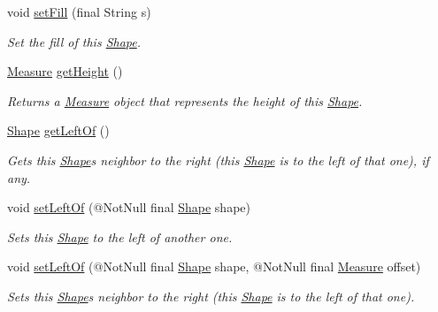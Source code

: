 \begin{DoxyCompactItemize}
void \hyperlink{classcom_1_1aarrelaakso_1_1drawl_1_1_shape_a81ff4feb49b8f74c1a639564748a23ee}{set\+Fill} (final String s)
\begin{DoxyCompactList}\small\item\em Set the fill of this \hyperlink{classcom_1_1aarrelaakso_1_1drawl_1_1_shape}{Shape}. \end{DoxyCompactList}\item 
\hyperlink{classcom_1_1aarrelaakso_1_1drawl_1_1_measure}{Measure} \hyperlink{classcom_1_1aarrelaakso_1_1drawl_1_1_shape_ac9f74d31c332aab76b329edc22080e67}{get\+Height} ()
\begin{DoxyCompactList}\small\item\em Returns a \hyperlink{classcom_1_1aarrelaakso_1_1drawl_1_1_measure}{Measure} object that represents the height of this \hyperlink{classcom_1_1aarrelaakso_1_1drawl_1_1_shape}{Shape}. \end{DoxyCompactList}\item 
\hyperlink{classcom_1_1aarrelaakso_1_1drawl_1_1_shape}{Shape} \hyperlink{classcom_1_1aarrelaakso_1_1drawl_1_1_shape_a2b19d5964ac46d545a7bae3133df6532}{get\+Left\+Of} ()
\begin{DoxyCompactList}\small\item\em Gets this \hyperlink{classcom_1_1aarrelaakso_1_1drawl_1_1_shape}{Shape}\textquotesingle{}s neighbor to the right (this \hyperlink{classcom_1_1aarrelaakso_1_1drawl_1_1_shape}{Shape} is to the left of that one), if any. \end{DoxyCompactList}\item 
void \hyperlink{classcom_1_1aarrelaakso_1_1drawl_1_1_shape_a0aef56392d76202235a9520394e87492}{set\+Left\+Of} (@Not\+Null final \hyperlink{classcom_1_1aarrelaakso_1_1drawl_1_1_shape}{Shape} shape)
\begin{DoxyCompactList}\small\item\em Sets this \hyperlink{classcom_1_1aarrelaakso_1_1drawl_1_1_shape}{Shape} to the left of another one. \end{DoxyCompactList}\item 
void \hyperlink{classcom_1_1aarrelaakso_1_1drawl_1_1_shape_a8012a3823982d77b563ef61787ccb523}{set\+Left\+Of} (@Not\+Null final \hyperlink{classcom_1_1aarrelaakso_1_1drawl_1_1_shape}{Shape} shape, @Not\+Null final \hyperlink{classcom_1_1aarrelaakso_1_1drawl_1_1_measure}{Measure} offset)
\begin{DoxyCompactList}\small\item\em Sets this \hyperlink{classcom_1_1aarrelaakso_1_1drawl_1_1_shape}{Shape}\textquotesingle{}s neighbor to the right (this \hyperlink{classcom_1_1aarrelaakso_1_1drawl_1_1_shape}{Shape} is to the left of that one). \end{DoxyCompactList}\item 

\end{DoxyCompactItemize}
